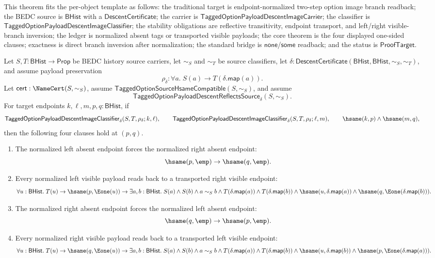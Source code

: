 \begin{theorem}
\label{thm:tagged-option-payload-descent-image-classifier-reflective-transitive-transported-visible-branch-inversion}
This theorem fits the per-object template as follows: the traditional target is
endpoint-normalized two-step option image branch readback; the BEDC source is
$\mathsf{BHist}$ with a $\mathsf{DescentCertificate}$; the carrier is
$\mathsf{TaggedOptionPayloadDescentImageCarrier}$; the classifier is
$\mathsf{TaggedOptionPayloadDescentImageClassifier}$; the stability obligations
are reflective transitivity, endpoint transport, and left/right visible-branch
inversion; the ledger is normalized absent tags or transported visible payloads;
the core theorem is the four displayed one-sided clauses; exactness is direct
branch inversion after normalization; the standard bridge is
$\mathsf{none}$/$\mathsf{some}$ readback; and the status is
$\mathsf{ProofTarget}$.

Let $S,T:\mathsf{BHist}\to\mathsf{Prop}$ be BEDC history source carriers, let
$\sim_S$ and $\sim_T$ be source classifiers, let
$\delta:\mathsf{DescentCertificate}(\mathsf{BHist},\mathsf{BHist},\sim_S,\sim_T)$,
and assume payload preservation
$$
\rho_{\delta}:\forall a.\;S(a)\to T(\delta.\mathsf{map}(a)).
$$
Let $\mathsf{cert}:\NameCert(S,\sim_S)$, assume
$\mathsf{TaggedOptionSourceHsameCompatible}(S,\sim_S)$, and assume
$$
\mathsf{TaggedOptionPayloadDescentReflectsSource}_{\delta}(S,\sim_S).
$$
For target endpoints $k,\ell,m,p,q:\mathsf{BHist}$, if
$$
\mathsf{TaggedOptionPayloadDescentImageClassifier}_{\delta}
(S,T,\rho_{\delta};k,\ell),
\qquad
\mathsf{TaggedOptionPayloadDescentImageClassifier}_{\delta}
(S,T,\rho_{\delta};\ell,m),
\qquad
\hsame(k,p)\land \hsame(m,q),
$$
then the following four clauses hold at $(p,q)$.
\begin{enumerate}
\item The normalized left absent endpoint forces the normalized right absent
endpoint:
$$
\hsame(p,\emp)\to\hsame(q,\emp).
$$

\item Every normalized left visible payload reads back to a transported right
visible endpoint:
$$
\forall u:\mathsf{BHist}.\;
T(u)\to
\hsame(p,\Eone(u))\to
\exists a,b:\mathsf{BHist}.\;
S(a)\land S(b)\land a\sim_S b\land
T(\delta.\mathsf{map}(a))\land T(\delta.\mathsf{map}(b))\land
\hsame(u,\delta.\mathsf{map}(a))\land
\hsame(q,\Eone(\delta.\mathsf{map}(b))).
$$

\item The normalized right absent endpoint forces the normalized left absent
endpoint:
$$
\hsame(q,\emp)\to\hsame(p,\emp).
$$

\item Every normalized right visible payload reads back to a transported left
visible endpoint:
$$
\forall u:\mathsf{BHist}.\;
T(u)\to
\hsame(q,\Eone(u))\to
\exists a,b:\mathsf{BHist}.\;
S(a)\land S(b)\land a\sim_S b\land
T(\delta.\mathsf{map}(a))\land T(\delta.\mathsf{map}(b))\land
\hsame(u,\delta.\mathsf{map}(b))\land
\hsame(p,\Eone(\delta.\mathsf{map}(a))).
$$
\end{enumerate}
\end{theorem}
